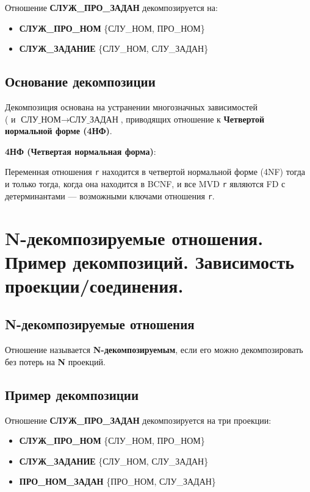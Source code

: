 \documentclass[a4paper,12pt]{article}
\begin{document}
Отношение \textbf{СЛУЖ\_ПРО\_ЗАДАН} декомпозируется на:
\begin{itemize}
    \item \textbf{СЛУЖ\_ПРО\_НОМ} \{СЛУ\_НОМ, ПРО\_НОМ\}
    \item \textbf{СЛУЖ\_ЗАДАНИЕ} \{СЛУ\_НОМ, СЛУ\_ЗАДАН\}
\end{itemize}

\subsection{Основание декомпозиции}

Декомпозиция основана на устранении многозначных зависимостей \\(\) и \(\mathbf{\text{СЛУ\_НОМ} \rightarrow \text{СЛУ\_ЗАДАН}}\), приводящих отношение к \textbf{Четвертой нормальной форме (4НФ)}.

\textbf{4НФ (Четвертая нормальная форма)}:

Переменная отношения \texttt{r} находится в четвертой нормальной форме (4NF) тогда и только тогда, когда она находится в BCNF, и все MVD \texttt{r} являются FD с детерминантами — возможными ключами отношения \texttt{r}.

\section{N-декомпозируемые отношения. Пример декомпозиций. Зависимость проекции/соединения.}

\subsection{N-декомпозируемые отношения}

Отношение называется \textbf{N-декомпозируемым}, если его можно декомпозировать без потерь на \textbf{N} проекций.

\subsection{Пример декомпозиции}

Отношение \textbf{СЛУЖ\_ПРО\_ЗАДАН} декомпозируется на три проекции:
\begin{itemize}
    \item \textbf{СЛУЖ\_ПРО\_НОМ} \{СЛУ\_НОМ, ПРО\_НОМ\}
    \item \textbf{СЛУЖ\_ЗАДАНИЕ} \{СЛУ\_НОМ, СЛУ\_ЗАДАН\}
    \item \textbf{ПРО\_НОМ\_ЗАДАН} \{ПРО\_НОМ, СЛУ\_ЗАДАН\}
\end{itemize}
\end{document}
